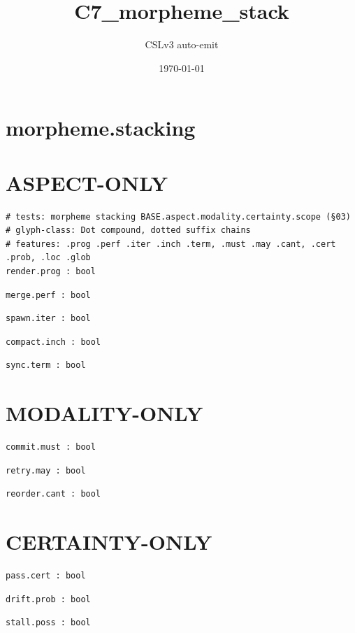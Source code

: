 \documentclass[11pt]{article}
\title{C7\_morpheme\_stack}
\author{CSLv3 auto-emit}
\date{\today}
\begin{document}
\maketitle
\tableofcontents

\section{morpheme.stacking}\label{sec:morphemestacking}
\section{ASPECT-ONLY}\label{sec:aspect-only}
\begin{lstlisting}[language=csl]
# tests: morpheme stacking BASE.aspect.modality.certainty.scope (§03)
# glyph-class: Dot compound, dotted suffix chains
# features: .prog .perf .iter .inch .term, .must .may .cant, .cert .prob, .loc .glob
render.prog : bool
\end{lstlisting}
\begin{lstlisting}[language=csl]
merge.perf : bool
\end{lstlisting}
\begin{lstlisting}[language=csl]
spawn.iter : bool
\end{lstlisting}
\begin{lstlisting}[language=csl]
compact.inch : bool
\end{lstlisting}
\begin{lstlisting}[language=csl]
sync.term : bool
\end{lstlisting}
\section{MODALITY-ONLY}\label{sec:modality-only}
\begin{lstlisting}[language=csl]
commit.must : bool
\end{lstlisting}
\begin{lstlisting}[language=csl]
retry.may : bool
\end{lstlisting}
\begin{lstlisting}[language=csl]
reorder.cant : bool
\end{lstlisting}
\section{CERTAINTY-ONLY}\label{sec:certainty-only}
\begin{lstlisting}[language=csl]
pass.cert : bool
\end{lstlisting}
\begin{lstlisting}[language=csl]
drift.prob : bool
\end{lstlisting}
\begin{lstlisting}[language=csl]
stall.poss : bool
\end{lstlisting}
\end{document}
